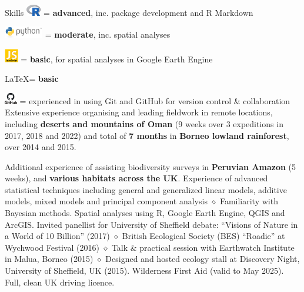 
\begin{rubric}{Skills}
    \includegraphics[height=0.5cm]{Rlogo.png} = \textbf {advanced}, inc. package development and R Markdown
    \par \includegraphics[height=0.5cm]{python-logo.png} = \textbf{moderate}, inc. spatial analyses
    \par \includegraphics[height=0.6cm]{javascript-logo.jpg} = \textbf{basic}, for spatial analyses in Google Earth Engine
    \par \LaTeX = \textbf{basic}
    \par \includegraphics[height=0.5cm]{github-logo.png} = experienced in using Git and GitHub for version control \& collaboration
\entry*[Fieldwork]
	Extensive experience organising and leading fieldwork in remote locations, including \textbf{deserts and mountains of Oman} (9 weeks over 3 expeditions in 2017, 2018 and 2022) and total of \textbf{7 months} in \textbf{Borneo lowland rainforest}, over 2014 and 2015.
    \par \hfill
    \par Additional experience of assisting biodiversity surveys in \textbf{Peruvian Amazon} (5 weeks), and \textbf{various habitats across the UK}.
	Experience of advanced statistical techniques including general and generalized linear models, additive models, mixed models and principal component analysis $\diamond$ Familiarity with Bayesian methods.
\entry*[GIS]
	Spatial analyses using R, Google Earth Engine, QGIS and ArcGIS.
	Invited panellist for University of Sheffield debate: ``Visions of Nature in a World of 10 Billion'' (2017) $\diamond$ British Ecological Society (BES) ``Roadie'' at Wychwood Festival (2016) $\diamond$ Talk \& practical session with Earthwatch Institute in Malua, Borneo (2015) $\diamond$ Designed and hosted ecology stall at Discovery Night, University of Sheffield, UK (2015).
	Wilderness First Aid (valid to May 2025).
\entry*[Driving]
	Full, clean UK driving licence.
\end{rubric}

